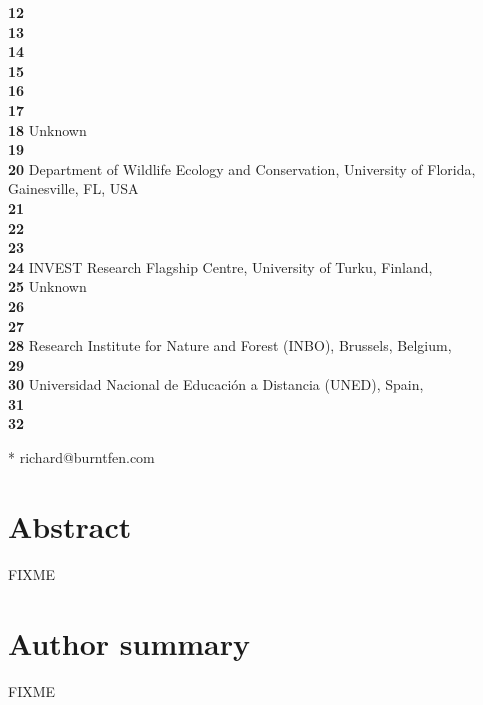 \documentclass[10pt,letterpaper]{article}
\begin{document}
\begin{flushleft}
\textbf{12} \\
\textbf{13} \\
\textbf{14} \\
\textbf{15} \\
\textbf{16} \\
\textbf{17} \\
\textbf{18} Unknown\\
\textbf{19} \\
\textbf{20} Department of Wildlife Ecology and Conservation, University of Florida, Gainesville, FL, USA \\
\textbf{21} \\
\textbf{22} \\
\textbf{23} \\
\textbf{24} INVEST Research Flagship Centre, University of Turku, Finland, \\
\textbf{25} Unknown\\
\textbf{26} \\
\textbf{27} \\
\textbf{28} Research Institute for Nature and Forest (INBO), Brussels, Belgium, \\
\textbf{29} \\
\textbf{30} Universidad Nacional de Educación a Distancia (UNED), Spain, \\
\textbf{31} \\
\textbf{32} 


* richard@burntfen.com
\end{flushleft}

\section*{Abstract}

FIXME


\section*{Author summary}

FIXME
\end{document}
